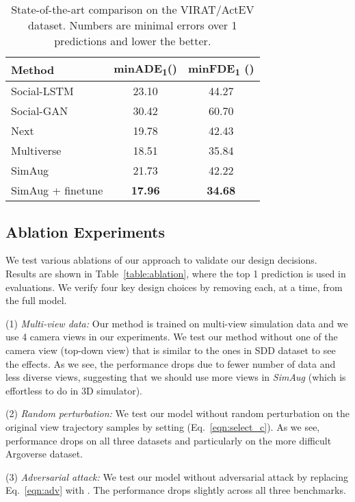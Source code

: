 \documentclass[runningheads]{eccv2020/llncs}
\newcommand{\fancyname}{SimAug}
\begin{document}
\begin{table}[]

\centering
\caption{State-of-the-art comparison on the VIRAT/ActEV dataset. Numbers are minimal errors over 1 predictions and lower the better. }
\begin{tabular}{lcc}
\toprule
Method & minADE\textsubscript{1}()   & minFDE\textsubscript{1} ()      \\ 
\midrule
Social-LSTM~\cite{alahi2016social}  & 23.10 & 44.27 \\
Social-GAN~\cite{gupta2018social}  & 30.42   & 60.70  \\ 
Next~\cite{liang2019peeking}  & 19.78 & 42.43\\
Multiverse~\cite{liang2020garden} & 18.51 & 35.84 \\
\midrule
SimAug & 21.73  & 42.22 \\
SimAug + finetune  & \textbf{17.96}  & \textbf{34.68} \\
\bottomrule
\end{tabular}
\label{table:actev}
\vspace{-5mm}
\end{table} 

\subsection{Ablation Experiments}

We test various ablations of our approach to validate our design decisions.
Results are shown in Table~\ref{table:ablation}, where the top 1 prediction is used in evaluations.
We verify four key design choices by removing each, at a time, from the full model.

(1) \textit{Multi-view data:} Our method is trained on multi-view simulation data and we use 4 camera views in our experiments. We test our method without one of the camera view (top-down view) that is similar to the ones in SDD dataset to see the effects. 
As we see, the performance drops due to fewer number of data and less diverse views, suggesting that we should use more views in \textit{\fancyname} (which is effortless to do in 3D simulator).

(2) \textit{Random perturbation:} We test our model without random perturbation on the original view trajectory samples by setting  (Eq.~\eqref{eqn:select_c}).
As we see, performance drops on all three datasets and particularly on the more difficult Argoverse dataset.

(3) \textit{Adversarial attack:} We test our model without adversarial attack by replacing Eq.~\eqref{eqn:adv} with . The performance drops slightly across all three benchmarks.
\end{document}
